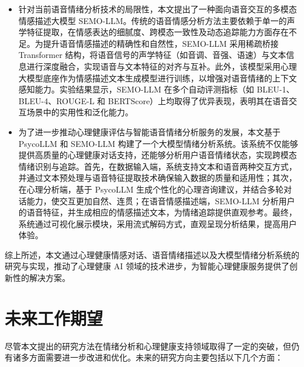 \begin{itemize}
  \item 针对当前语音情绪分析技术的局限性，本文提出了一种面向语音交互的多模态情感描述大模型 SEMO-LLM。传统的语音情感分析方法主要依赖于单一的声学特征提取，在情感表达的细腻度、跨模态一致性及动态追踪能力方面存在不足。为提升语音情感描述的精确性和自然性，SEMO-LLM 采用稀疏桥接 Transformer 结构，将语音信号的声学特征（如音调、音强、语速）与文本信息进行深度融合，实现语音与文本特征的对齐与互补。此外，该模型采用心理大模型底座作为情感描述文本生成模型进行训练，以增强对语音情绪的上下文感知能力。实验结果显示，SEMO-LLM 在多个自动评测指标（如 BLEU-1、BLEU-4、ROUGE-L 和 BERTScore）上均取得了优异表现，表明其在语音交互场景中的实用性和泛化能力。
  \item 为了进一步推动心理健康评估与智能语音情绪分析服务的发展，本文基于 PsycoLLM 和 SEMO-LLM 构建了一个大模型情绪分析系统。该系统不仅能够提供高质量的心理健康对话支持，还能够分析用户语音情绪状态，实现跨模态情绪识别与追踪。首先，在数据输入端，系统支持文本和语音两种交互方式，并通过文本预处理与语音特征提取技术确保输入数据的质量和适用性；其次，在心理分析端，基于 PsycoLLM 生成个性化的心理咨询建议，并结合多轮对话能力，使交互更加自然、连贯；在语音情感描述端，SEMO-LLM 分析用户的语音特征，并生成相应的情感描述文本，为情绪追踪提供直观参考。最终，系统通过可视化展示模块，采用流式解码方式，直观呈现分析结果，提高用户体验。
\end{itemize}

综上所述，本文通过心理健康情感对话、语音情绪描述以及大模型情绪分析系统的研究与实现，推动了心理健康 AI 领域的技术进步，为智能心理健康服务提供了创新性的解决方案。

\section{未来工作期望}

尽管本文提出的研究方法在情绪分析和心理健康支持领域取得了一定的突破，但仍有诸多方面需要进一步改进和优化。未来的研究方向主要包括以下几个方面：

